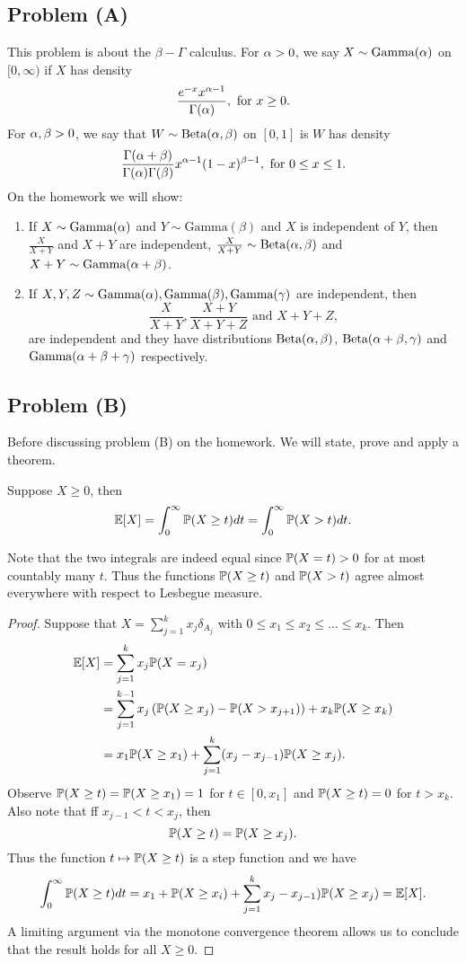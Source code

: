 \subsection{Problem (A)}
This problem is about the $\beta-\Gamma$ calculus. For ${\alpha} >0$, we say $X \sim \text{Gamma}({\alpha})$ on $[0,\infty)$ if $X$ has density 
\[\frac{e^{-x}x^{{\alpha}-1}}{\Gamma({\alpha})}, \text{ for } x \ge 0. \]
For ${\alpha},\beta > 0$, we say that $W \sim \text{Beta}({\alpha},\beta)$ on $[0,1]$ is $W$ has density 
\[\frac{\Gamma({\alpha}+\beta)}{\Gamma({\alpha})\Gamma(\beta)} x^{{\alpha}-1}(1-x)^{\beta-1}, \text{ for } 0\le x \le 1. \]
On the homework we will show:
\begin{enumerate}
    \item If $X \sim \text{Gamma}({\alpha})$ and $Y \sim \text{Gamma}(\beta)$ and $X$ is independent of $Y$, then $\frac{X}{X+Y}$ and $X+Y$ are independent, $\frac{X}{X+Y} \sim \text{Beta}({\alpha},\beta)$ and $X+Y \sim \text{Gamma}({\alpha}+\beta)$.
    \item If $X,Y,Z \sim \text{Gamma}({\alpha}),\text{Gamma}(\beta), \text{Gamma}(\gamma)$ are independent, then 
    \[\frac{X}{X+Y}, \frac{X+Y}{X+Y+Z} \text{ and } X+Y+Z,\]
    are independent and they have distributions $\text{Beta}({\alpha},\beta)$, $\text{Beta}({\alpha}+\beta,\gamma)$ and $\text{Gamma}({\alpha}+\beta+\gamma)$ respectively.
\end{enumerate}
\subsection{Problem (B)}
Before discussing problem (B) on the homework. We will state, prove and apply a theorem.
\begin{thrm}
    Suppose $X \ge 0$, then 
    \[{\mathbb{E}}[X] = \int_0^\infty {\mathbb{P}}(X \ge t)dt = \int_0^\infty {\mathbb{P}}(X >t)dt. \]
\end{thrm}
Note that the two integrals are indeed equal since ${\mathbb{P}}(X=t) >0$ for at most countably many $t$. Thus the functions ${\mathbb{P}}(X\ge t)$ and ${\mathbb{P}}(X>t)$ agree almost everywhere with respect to Lesbegue measure. 
\begin{proof}
    Suppose that $X = \sum_{j=1}^k x_j \delta_{A_j}$ with $0 \le x_1\le x_2\le \ldots\le x_k$. Then 
    \begin{align*}
        {\mathbb{E}}[X] &=\sum_{j=1}^k x_j {\mathbb{P}}(X=x_j)\\
        &=\sum_{j=1}^{k-1}x_j\left({\mathbb{P}}(X\ge x_j)-{\mathbb{P}}(X>x_{j+1})\right)+x_k{\mathbb{P}}(X\ge x_k)\\
        &=x_1{\mathbb{P}}(X \ge x_1)+\sum_{j=1}^k(x_j-x_{j-1}){\mathbb{P}}(X \ge x_j).
    \end{align*}
    Observe ${\mathbb{P}}(X \ge t) = {\mathbb{P}}(X \ge x_1) = 1$ for $t \in [0,x_1]$ and ${\mathbb{P}}(X \ge t) = 0$ for $t > x_k$. Also note that ff $x_{j-1} < t < x_j$, then 
    \[{\mathbb{P}}(X \ge t) = {\mathbb{P}}(X \ge x_j). \]
    Thus the function $t \mapsto {\mathbb{P}}(X \ge t)$ is a step function and we have 
    \[\int_0^\infty {\mathbb{P}}(X \ge t)dt = x_1+{\mathbb{P}}(X\ge x_i)+\sum_{j=1}^k x_j-x_{j-1}){\mathbb{P}}(X \ge x_j) = {\mathbb{E}}[X]. \]
    A limiting argument via the monotone convergence theorem allows us to conclude that the result holds for all $X \ge 0$. 
\end{proof}
